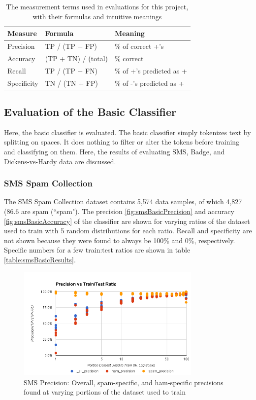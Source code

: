 \begin{table}
    \begin{tabular}{lll}
        \hline
        \textbf{Measure} & \textbf{Formula} & \textbf{Meaning} \\ [0.5ex]
        \hline\hline
        Precision	& TP / (TP + FP) & \% of correct +'s \\
        Accuracy	& (TP + TN) / (total) & \% correct \\
        Recall 	    & TP / (TP + FN) & \% of +'s predicted as + \\
        Specificity	& TN / (TN + FP) & \% of -'s predicted as + \\
        \hline
    \end{tabular}
    \caption{The measurement terms used in evaluations for this project, with their formulas and intuitive meanings}
    \label{table:measures}
\end{table}

\subsection{Evaluation of the Basic Classifier}
\label{subsection:basicResults}
Here, the basic classifier is evaluated. The basic classifier simply tokenizes text by splitting on spaces. It does
nothing to filter or alter the tokens before training and classifying on them. Here, the results of evaluating SMS,
Badge, and Dickens-vs-Hardy data are discussed.

\subsubsection{SMS Spam Collection}
\label{subsection:smsBasic}
The SMS Spam Collection dataset \cite{sms} contains 5,574 data samples, of which 4,827 (86.6%
are spam (``spam"). The precision \ref{fig:smsBasicPrecision} and accuracy \ref{fig:smsBasicAccuracy} of the classifier
are shown for varying ratios of the dataset used to train with 5 random distributions for each ratio. Recall and
specificity are not shown because they were found to always be 100\% and 0\%, respectively. Specific numbers
for a few train:test ratios are shown in table \ref{table:smsBasicResults}.

\begin{figure}[ht!]
    \centering
    \includegraphics[width=90mm]{img/sms_basic-precision.png}
    \caption{SMS Precision: Overall, spam-specific, and ham-specific precisions found at varying portions of the dataset used to train}
    \label{fig:spamBasicPrecision}
\end{figure}

